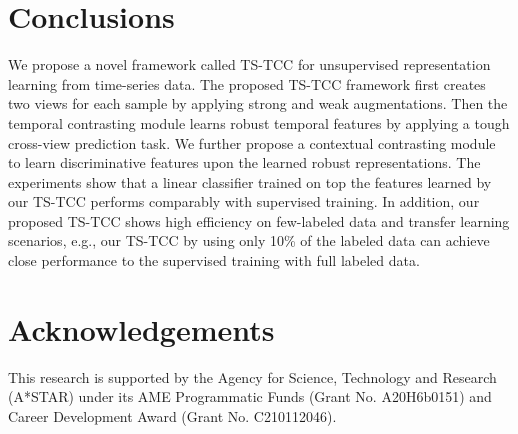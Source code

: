 \documentclass{article}
\begin{document}
\section{Conclusions}
We propose a novel framework called TS-TCC for unsupervised representation learning from time-series data. 
The proposed TS-TCC framework first creates two views for each sample by applying strong and weak augmentations. Then the temporal contrasting module learns robust temporal features by applying a tough cross-view prediction task. We further propose a contextual contrasting module to learn discriminative features upon the learned robust representations. The experiments show that a linear classifier trained on top the features learned by our TS-TCC performs comparably with supervised training. In addition, our proposed TS-TCC shows high efficiency on few-labeled data and transfer learning scenarios, e.g., our TS-TCC by using only 10\% of the labeled data can achieve close performance to the supervised training with full labeled data.

\section*{Acknowledgements}
This research is supported by the Agency for Science, Technology and Research (A*STAR) under its AME Programmatic Funds (Grant No. A20H6b0151) and Career Development Award (Grant No. C210112046).



\end{document}
